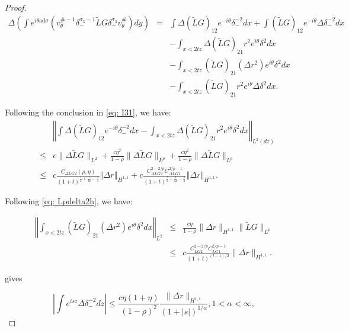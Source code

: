 \documentclass{amsart}
\theoremstyle{plain}
\theoremstyle{remark}
\numberwithin{equation}{section}
\begin{document}
\begin{proof}
    \begin{eqnarray*}
    \Delta \left(\int e^{i \theta \mathrm{ad} \sigma}\left(v_\theta^{\#-1}\delta_-^{\sigma_3-1}\tilde{L}G\delta_-^{\sigma_3}v_\theta^{\#}\right) dy \right)&=& \int \Delta (\tilde{L}G)_{12}e^{-i\theta}\delta_-^{-2}dx+\int (\tilde{L}G)_{12}e^{-i\theta} \Delta \delta_-^{-2}dx\\
    &&-\int_{x<2tz}\Delta (\tilde{L}G)_{21}r^2e^{i\theta}\delta^2dx\\
    &&-\int_{x<2tz}(\tilde{L}G)_{21} (\Delta r^2) e^{i\theta}\delta^2dx\\
    &&-\int_{x<2tz}(\tilde{L}G)_{21}r^2e^{i\theta} \Delta \delta^2dx.
    \end{eqnarray*}

    Following the conclusion in \eqref{eq: I31}, we have:
    \begin{eqnarray*}
    &&\left\Vert\int \Delta (\tilde{L}G)_{12}e^{-i\theta}\delta_-^{-2}dx-\int_{x<2tz} \Delta (\tilde{L}G)_{21}r^2e^{i\theta}\delta^2dx\right\Vert_{L^2(dz)}\\
    &\leq& c\|\Delta \tilde{L}G\|_{L^2}+\frac{c\eta^2}{1-\rho}\|\Delta \tilde{L}G\|_{L^p}+\frac{c\eta^2}{1-\rho}\|\Delta \tilde{L}G\|_{L^p}\\
    \nonumber
    &\leq& c \frac{C_{\Delta LG2}(\rho, \eta)}{(1+t)^{\frac{l}{2}+\frac{1}{2p}-\frac{3}{4}}}\left\Vert \Delta r\right\Vert _{H^{1,1}} +c\frac{C_{\Delta LG2}^{2-2/p} C_{\Delta LG1}^{2/p-1}}{(1+t)^{\frac{l}{2}+\frac{1}{2p}-\frac{3}{4}}}\left\Vert \Delta r\right\Vert _{H^{1,1}}.
    \end{eqnarray*}

    Following \eqref{eq: Lpdelta2h}, we have:

    \begin{eqnarray*}
    \left\Vert\int_{x<2tz}(\tilde{L}G)_{21} (\Delta r^2) e^{i\theta}\delta^2dx\right\Vert_{L^2}
    &\leq& \frac{c\eta}{1-\rho}\|\Delta r\|_{H^{1,1}}\|\tilde{L}G\|_{L^p}\\
    &\leq&c\frac{C_{LG2}^{2-2/p} C_{LG1}^{2/p-1}}{(1+t)^{(l-1)/2}}\|\Delta r\|_{H^{1,1}}.
    \end{eqnarray*}

    \cite[(6.40)]{DZ-2} gives 

    \begin{equation}
    \left\vert \int e^{isz}\Delta \delta_-^{-2}dz \right\vert \leq \frac{c\eta(1+\eta)}{(1-\rho)^2}\frac{\|\Delta r\|_{H^{1,1}}}{(1+|s|)^{1/\alpha}}, 1<\alpha<\infty,
    \end{equation}
    

\end{proof}
\end{document}
